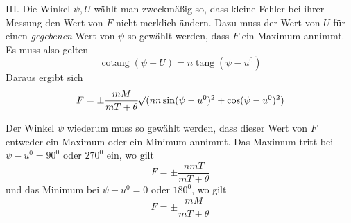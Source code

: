 III. Die Winkel $\psi,U$ wählt man zweckmäßig so, dass kleine Fehler bei ihrer Messung den Wert von $F$ nicht merklich ändern. Dazu muss der Wert von $U$ für einen \textit{gegebenen} Wert von $\psi$ so gewählt werden, dass $F$ ein Maximum annimmt. Es muss also gelten
\[
\operatorname{cotang}(\psi-U)=n\operatorname{tang}(\psi-u^0)
\]
Daraus ergibt sich
\[
F=\pm\frac{mM}{mT+\theta}\mathord{{}^{}\!\surd}(nn\sin(\psi-u^0)^2+\cos(\psi-u^0)^2)
\]

Der Winkel $\psi$ wiederum muss so gewählt werden, dass dieser Wert von $F$ entweder ein Maximum oder ein Minimum annimmt. Das Maximum tritt bei $\psi-u^0=90^0$ oder $270^0$ ein, wo gilt
\[
F=\pm\frac{nmT}{mT+\theta}
\]
und das Minimum bei $\psi-u^0=0$ oder $180^0$, wo gilt
\[
F=\pm\frac{mM}{mT+\theta}
\]

